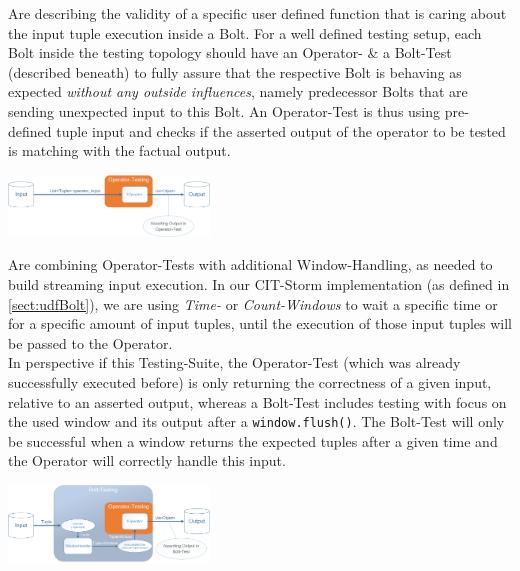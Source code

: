 	\begin{description}
		Are describing the validity of a specific user defined function that is caring about the input tuple execution inside a Bolt. For a well defined testing setup, each Bolt inside the testing topology should have an Operator- \& a Bolt-Test (described beneath) to fully assure that the respective Bolt is behaving as expected \textit{without any outside influences}, namely predecessor Bolts that are sending unexpected input to this Bolt. An Operator-Test is thus using pre-defined tuple input and checks if the asserted output of the operator to be tested is matching with the factual output.
		\begin{center}
			\includegraphics[width=0.4\textwidth]{./images/09_testing/OperatorTests.png}
		\end{center}

		
		Are combining Operator-Tests with additional Window-Handling, as needed to build streaming input execution. In our CIT-Storm implementation (as defined in \ref{sect:udfBolt}), we are using \textit{Time-} or \textit{Count-Windows} to wait a specific time or for a specific amount of input tuples, until the execution of those input tuples will be passed to the Operator. \\
		In perspective if this Testing-Suite, the Operator-Test (which was already successfully executed before) is only returning the correctness of a given input, relative to an asserted output, whereas a Bolt-Test includes testing with focus on the used window and its output after a \texttt{window.flush()}. The Bolt-Test will only be successful when a window returns the expected tuples after a given time and the Operator will correctly handle this input.
		\begin{center}
			\includegraphics[width=0.4\textwidth]{./images/09_testing/BoltTests.png}
		\end{center}
	 

\end{description}
